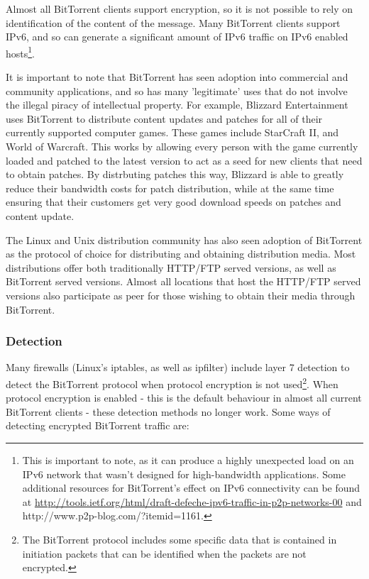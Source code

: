 \documentclass{article}
\theoremstyle{remark}
\theoremstyle{definition}
\theoremstyle{definition}
\theoremstyle{definition}
\begin{document}
Almost all BitTorrent clients support encryption, so it is not possible to rely on identification of the content of the message. Many BitTorrent clients support IPv6, and so can generate a significant amount of IPv6 traffic on IPv6 enabled hosts\footnote{This is important to note, as it can produce a highly unexpected load on an IPv6 network that wasn't designed for high-bandwidth applications. Some additional resources for BitTorrent's effect on IPv6 connectivity can be found at  \url{http://tools.ietf.org/html/draft-defeche-ipv6-traffic-in-p2p-networks-00} and {http://www.p2p-blog.com/?itemid=1161}.}.

It is important to note that BitTorrent has seen adoption into commercial and community applications, and so has many 'legitimate' uses that do not involve the illegal piracy of intellectual property. For example, Blizzard Entertainment uses BitTorrent to distribute content updates and patches for all of their currently supported computer games. These games include StarCraft II, and World of Warcraft. This works by allowing every person with the game currently loaded and patched to the latest version to act as a seed for new clients that need to obtain patches. By distrbuting patches this way, Blizzard is able to greatly reduce their bandwidth costs for patch distribution, while at the same time ensuring that their customers get very good download speeds on patches and content update.

The Linux and Unix distribution community has also seen adoption of BitTorrent as the protocol of choice for distributing and obtaining distribution media. Most distributions offer both traditionally HTTP/FTP served versions, as well as BitTorrent served versions. Almost all locations that host the HTTP/FTP served versions also participate as peer for those wishing to obtain their media through BitTorrent.

\subsubsection{Detection}
Many firewalls (Linux's iptables, as well as ipfilter) include layer 7 detection to detect the BitTorrent protocol when protocol encryption is not used\footnote{The BitTorrent protocol includes some specific data that is contained in initiation packets that can be identified when the packets are not encrypted.}. When protocol encryption is enabled - this is the default behaviour in almost all current BitTorrent clients - these detection methods no longer work. Some ways of detecting encrypted BitTorrent traffic are:
\end{document}
